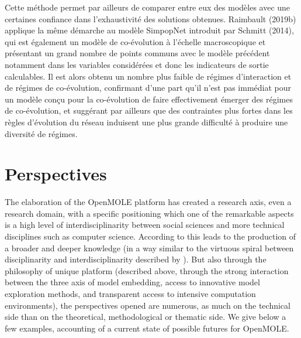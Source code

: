 \documentclass[10pt]{article}
\begin{document}
Cette méthode permet par ailleurs de comparer entre eux des modèles avec une certaines confiance dans l'exhaustivité des solutions obtenues. Raimbault (2019b) applique la même démarche au modèle SimpopNet introduit par Schmitt (2014), qui est également un modèle de co-évolution à l'échelle macroscopique et présentant un grand nombre de points communs avec le modèle précédent notamment dans les variables considérées et donc les indicateurs de sortie calculables. Il est alors obtenu un nombre plus faible de régimes d’interaction et de régimes de co-évolution, confirmant d’une part qu’il n’est pas immédiat pour un modèle conçu pour la co-évolution de faire effectivement émerger des régimes de co-évolution, et suggérant par ailleurs que des contraintes plus fortes dans les règles d'évolution du réseau induisent une plus grande difficulté à produire une diversité de régimes. 



\section{Perspectives}

The elaboration of the OpenMOLE platform has created a research axis, even a research domain, with a specific positioning which one of the remarkable aspects is a high level of interdisciplinarity between social sciences and more technical disciplines such as computer science. According to \cite{banos2017knowledge} this leads to the production of a broader and deeper knowledge (in a way similar to the virtuous spiral between disciplinarity and interdisciplinarity described by \cite{banos2013pour}). But also through the philosophy of unique platform (described above, through the strong interaction between the three axis of model embedding, access to innovative model exploration methods, and transparent access to intensive computation environments), the perspectives opened are numerous, as much on the technical side than on the theoretical, methodological or thematic side. We give below a few examples, accounting of a current state of possible futures for OpenMOLE.
\end{document}
